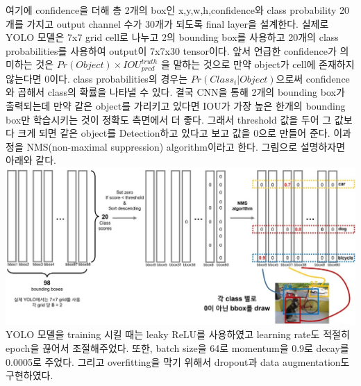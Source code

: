\documentclass[extendedabs]{bmvc2k}
\begin{document}
여기에 confidence을 더해 총 2개의 box인 x,y,w,h,confidence와 class probability 20개를 가지고 output channel 수가 30개가 되도록 final layer을 설계한다.
실제로 YOLO 모델은 7x7 grid cell로 나누고 2의 bounding box를 사용하고 20개의 class probabilities를 사용하여 output이 7x7x30 tensor이다. 
앞서 언급한 confidence가 의미하는 것은 $Pr(Object) \times IOU_{pred}^{truth}$ 을 말하는 것으로 만약 object가 cell에 존재하지 않는다면 0이다.
class probabilities의 경우는 $Pr(Class_i|Object)$으로써 confidence와 곱해서 class의 확률을 나타낼 수 있다. 
결국 CNN을 통해 2개의 bounding box가 출력되는데 만약 같은 object를 가리키고 있다면 IOU가 가장 높은 한개의 bounding box만 학습시키는 것이 정확도 측면에서 더 좋다.
그래서 threshold 값을 두어 그 값보다 크게 되면 같은 object를 Detection하고 있다고 보고 값을 0으로 만들어 준다. 이과정을 NMS(non-maximal suppression) algorithm이라고 한다. 그림으로 설명하자면 아래와 같다.
\newline  \includegraphics[width=\linewidth]{images/04_YOLO.PNG}
 YOLO 모델을 training 시킬 때는 leaky ReLU를 사용하였고 learning rate도 적절히 epoch을 끊어서 조절해주었다. 
또한, batch size을 64로 momentum을 0.9로 decay를 0.0005로 주었다. 그리고 overfitting을 막기 위해서 dropout과 data augmentation도 구현하였다.
\end{document}
